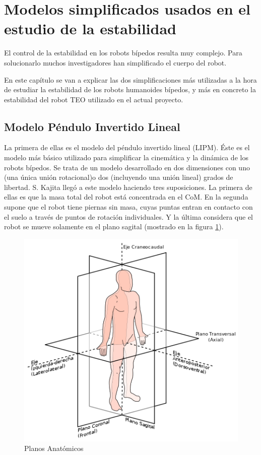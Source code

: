 \section{Modelos simplificados usados en el estudio de la estabilidad}

El control de la estabilidad en los robots bípedos resulta muy complejo. Para solucionarlo muchos investigadores han simplificado el cuerpo del robot. 

En este capítulo se van a explicar las dos simplificaciones más utilizadas a la hora de estudiar la estabilidad de los robots humanoides bípedos, y más en concreto la estabilidad del robot TEO utilizado en el actual proyecto.



\subsection{Modelo Péndulo Invertido Lineal}

La primera de ellas es el modelo del péndulo invertido lineal (LIPM). Éste es el modelo más básico utilizado para simplificar la cinemática y la dinámica de los robots bípedos. Se trata de un modelo desarrollado en dos dimensiones con uno (una única unión rotacional)o dos (incluyendo una unión lineal) grados de libertad. S. Kajita \cite{ref10} llegó a este modelo haciendo tres suposiciones. La primera de ellas es que la masa total del robot está concentrada en el CoM. En la segunda supone que el robot tiene piernas sin masa, cuyas puntas entran en contacto con el suelo a través de puntos de rotación individuales. Y la última considera que el robot se mueve solamente en el plano sagital (mostrado en la figura \ref{figura41}).

\begin{figure}[H]
\centering
\includegraphics[scale=0.6]{imagenes/apartado_4/41_plano_anatomico_sagital3}
\caption{Planos Anatómicos}
\label{figura41}
\end{figure}


